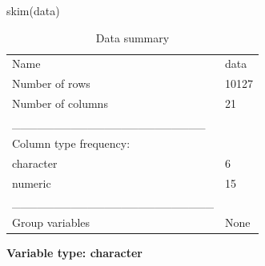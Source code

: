 \documentclass[
  letterpaper,
  DIV=11,
  numbers=noendperiod]{scrartcl}
\newenvironment{Shaded}{\begin{snugshade}}{\end{snugshade}}
\newcommand{\FunctionTok}[1]{\textcolor[rgb]{0.28,0.35,0.67}{#1}}
\newcommand{\NormalTok}[1]{\textcolor[rgb]{0.00,0.23,0.31}{#1}}
\begin{document}
\begin{Shaded}
\begin{Highlighting}[]
\FunctionTok{skim}\NormalTok{(data)}
\end{Highlighting}
\end{Shaded}

\begin{longtable}[]{@{}ll@{}}
\caption{Data summary}\tabularnewline
\toprule\noalign{}
\endfirsthead
\endhead
\bottomrule\noalign{}
\endlastfoot
Name & data \\
Number of rows & 10127 \\
Number of columns & 21 \\
\_\_\_\_\_\_\_\_\_\_\_\_\_\_\_\_\_\_\_\_\_\_\_ & \\
Column type frequency: & \\
character & 6 \\
numeric & 15 \\
\_\_\_\_\_\_\_\_\_\_\_\_\_\_\_\_\_\_\_\_\_\_\_\_ & \\
Group variables & None \\
\end{longtable}

\textbf{Variable type: character}
\end{document}
